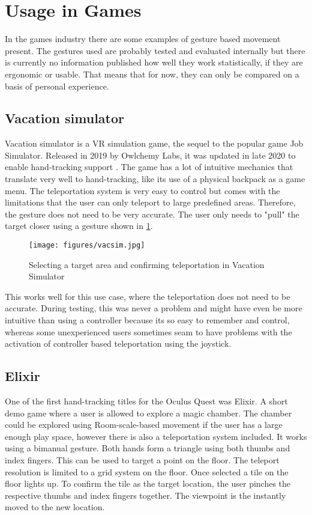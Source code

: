 \section{Usage in Games}
In the games industry there are some examples of gesture based movement present. The gestures used are probably tested and evaluated internally but there is currently no information published how well they work statistically, if they are ergonomic or usable. That means that for now, they can only be compared on a basis of personal experience. 


\subsection{Vacation simulator}
Vacation simulator \cite{VacSimOculus} is a VR simulation game, the sequel to the popular game Job Simulator. Released in 2019 by Owlchemy Labs, it was updated in late 2020 to enable hand-tracking support \cite{VacSimBlog}. The game has a lot of intuitive mechanics that translate very well to hand-tracking, like its use of a physical backpack as a game menu. The teleportation system is very easy to control but comes with the limitations that the user can only teleport to large predefined areas. Therefore, the gesture does not need to be very accurate. The user only needs to "pull" the target closer using a gesture shown in \ref{fig:pull}. 

\begin{figure}[hbt!]
  \centering
  \texttt{[image: figures/vacsim.jpg]}
  \caption{Selecting a target area and confirming teleportation in Vacation Simulator}
  \label{fig:pull}
\end{figure}

This works well for this use case, where the teleportation does not need to be accurate. During testing, this was never a problem and might have even be more intuitive than using a controller because its so easy to remember and control, whereas some unexperienced users sometimes seam to have problems with the activation of controller based teleportation using the joystick. 


\subsection{Elixir}
One of the first hand-tracking titles for the Oculus Quest was Elixir. A short demo game where a user is allowed to explore a magic chamber. The chamber could be explored using Room-scale-based movement if the user has a large enough play space, however there is also a teleportation system included. It works using a bimanual gesture. Both hands form a triangle using both thumbs and index fingers. This can be used to target a point on the floor. The teleport resolution is limited to a grid system on the floor. Once selected a tile on the floor lights up. To confirm the tile as the target location, the user pinches the respective thumbs and index fingers together. The viewpoint is the instantly moved to the new location.

